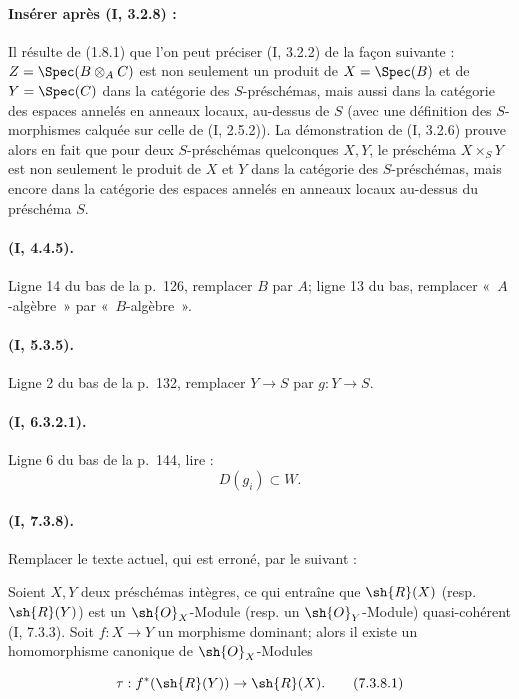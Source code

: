 \paragraph{Insérer après (I, 3.2.8) :}

\begin{env}[3.2.9]
\label{ega2:addendum:I.3.2.9-fr}
Il résulte de (1.8.1) que l'on peut préciser (I, 3.2.2) de la façon
suivante : $Z=\Spec(B\otimes_A C)$ est non seulement un produit de
$X=\Spec(B)$ et de $Y=\Spec(C)$ dans la catégorie des $S$-préschémas,
mais aussi dans la catégorie des espaces annelés en anneaux locaux,
au-dessus de $S$ (avec une définition des $S$-morphismes calquée sur
celle de (I, 2.5.2)). La démonstration de (I, 3.2.6) prouve alors en
fait que pour deux $S$-préschémas quelconques $X,Y$, le préschéma
$X\times_S Y$ est non seulement le produit de $X$ et $Y$ dans la
catégorie des $S$-préschémas, mais encore dans la catégorie des espaces
annelés en anneaux locaux au-dessus du préschéma $S$.
\end{env}

\paragraph{(I, 4.4.5).}
Ligne 14 du bas de la p.~126, remplacer $B$ par $A$; ligne 13 du bas,
remplacer «~$A$-algèbre~» par «~$B$-algèbre~».

\paragraph{(I, 5.3.5).}
Ligne 2 du bas de la p.~132, remplacer $Y\to S$ par $g:Y\to S$.

\paragraph{(I, 6.3.2.1).}
Ligne 6 du bas de la p.~144, lire :
\[
  D(g_i)\subset W.
\]

\paragraph{(I, 7.3.8).}
Remplacer le texte actuel, qui est erroné, par le suivant :

Soient $X,Y$ deux préschémas intègres, ce qui entraîne que
$\sh{R}(X)$ (resp. $\sh{R}(Y)$) est un $\sh{O}_X$-Module (resp. un
$\sh{O}_Y$-Module) quasi-cohérent (I, 7.3.3). Soit $f:X\to Y$ un
morphisme dominant; alors il existe un homomorphisme canonique de
$\sh{O}_X$-Modules
\begin{equation}
\label{ega2:addendum:I.7.3.8.1-fr}
  \tau:f^*(\sh{R}(Y))\to\sh{R}(X).
\tag{7.3.8.1}
\end{equation}

